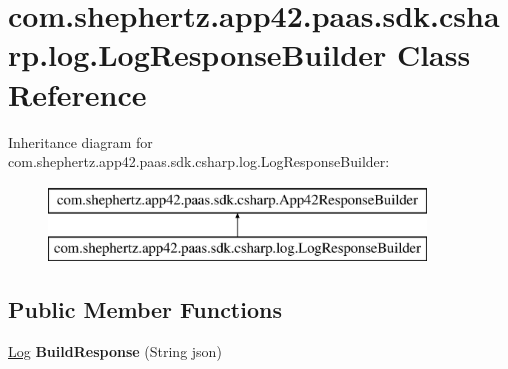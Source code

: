 \hypertarget{classcom_1_1shephertz_1_1app42_1_1paas_1_1sdk_1_1csharp_1_1log_1_1_log_response_builder}{\section{com.\+shephertz.\+app42.\+paas.\+sdk.\+csharp.\+log.\+Log\+Response\+Builder Class Reference}
\label{classcom_1_1shephertz_1_1app42_1_1paas_1_1sdk_1_1csharp_1_1log_1_1_log_response_builder}
}
Inheritance diagram for com.\+shephertz.\+app42.\+paas.\+sdk.\+csharp.\+log.\+Log\+Response\+Builder\+:\begin{figure}[H]
\begin{center}
\leavevmode
\includegraphics[height=2.000000cm]{classcom_1_1shephertz_1_1app42_1_1paas_1_1sdk_1_1csharp_1_1log_1_1_log_response_builder}
\end{center}
\end{figure}
\subsection*{Public Member Functions}
\begin{DoxyCompactItemize}
\item 
\hypertarget{classcom_1_1shephertz_1_1app42_1_1paas_1_1sdk_1_1csharp_1_1log_1_1_log_response_builder_a6afc448dd63a8e22c04d781f7d1e0fb7}{\hyperlink{classcom_1_1shephertz_1_1app42_1_1paas_1_1sdk_1_1csharp_1_1log_1_1_log}{Log} {\bfseries Build\+Response} (String json)}\label{classcom_1_1shephertz_1_1app42_1_1paas_1_1sdk_1_1csharp_1_1log_1_1_log_response_builder_a6afc448dd63a8e22c04d781f7d1e0fb7}

\end{DoxyCompactItemize}
